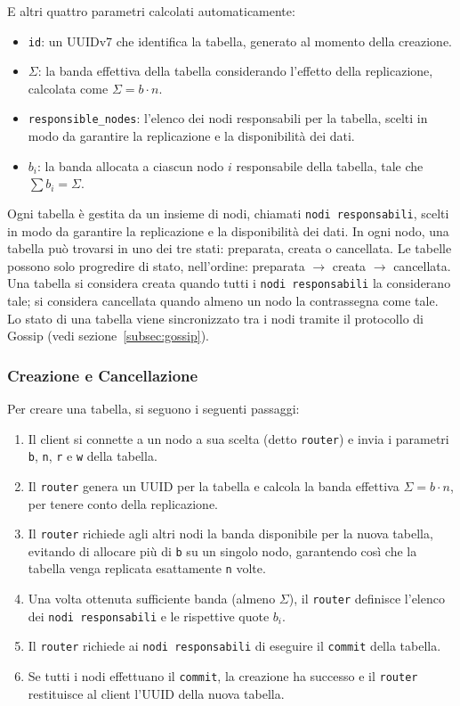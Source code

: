 E altri quattro parametri calcolati automaticamente:
\begin{itemize}
    \item \texttt{id}: un UUIDv7 che identifica la tabella, generato al momento della creazione.
    \item $\Sigma$: la banda effettiva della tabella considerando l'effetto della replicazione, calcolata come $\Sigma = b \cdot n$.
    \item \texttt{responsible\_nodes}: l'elenco dei nodi responsabili per la tabella, scelti in modo da garantire la replicazione e la disponibilità dei dati.
    \item $b_i$: la banda allocata a ciascun nodo $i$ responsabile della tabella, tale che $\sum b_i = \Sigma$.
\end{itemize}

Ogni tabella è gestita da un insieme di nodi, chiamati \texttt{nodi responsabili}, scelti in modo da garantire la replicazione e la disponibilità dei dati.
In ogni nodo, una tabella può trovarsi in uno dei tre stati: preparata, creata o cancellata.
Le tabelle possono solo progredire di stato, nell'ordine: preparata $\rightarrow$ creata $\rightarrow$ cancellata.
Una tabella si considera creata quando tutti i \texttt{nodi responsabili} la considerano tale; si considera cancellata quando almeno un nodo la contrassegna come tale.
Lo stato di una tabella viene sincronizzato tra i nodi tramite il protocollo di Gossip (vedi sezione~\ref{subsec:gossip}).

\subsubsection{Creazione e Cancellazione}
\label{subsubsec:creazione-cancellazione}

Per creare una tabella, si seguono i seguenti passaggi:
\begin{enumerate}
    \item Il client si connette a un nodo a sua scelta (detto \texttt{router}) e invia i parametri \texttt{b}, \texttt{n}, \texttt{r} e \texttt{w} della tabella.
    \item Il \texttt{router} genera un UUID per la tabella e calcola la banda effettiva $\Sigma = b \cdot n$, per tenere conto della replicazione.
    \item Il \texttt{router} richiede agli altri nodi la banda disponibile per la nuova tabella, evitando di allocare più di \texttt{b} su un singolo nodo, garantendo così che la tabella venga replicata esattamente \texttt{n} volte.
    \item Una volta ottenuta sufficiente banda (almeno $\Sigma$), il \texttt{router} definisce l'elenco dei \texttt{nodi responsabili} e le rispettive quote $b_i$.
    \item Il \texttt{router} richiede ai \texttt{nodi responsabili} di eseguire il \texttt{commit} della tabella.
    \item Se tutti i nodi effettuano il \texttt{commit}, la creazione ha successo e il \texttt{router} restituisce al client l'UUID della nuova tabella.
\end{enumerate}

